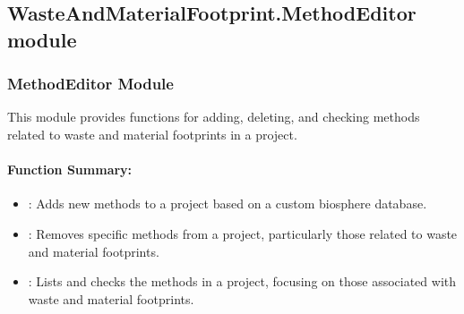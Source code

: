 \documentclass[letterpaper,10pt,english]{sphinxmanual}
\begin{document}
\subsection{WasteAndMaterialFootprint.MethodEditor module}
\label{\detokenize{WasteAndMaterialFootprint:module-WasteAndMaterialFootprint.MethodEditor}}\label{\detokenize{WasteAndMaterialFootprint:wasteandmaterialfootprint-methodeditor-module}}

\subsubsection{MethodEditor Module}
\label{\detokenize{WasteAndMaterialFootprint:methodeditor-module}}
\sphinxAtStartPar
This module provides functions for adding, deleting, and checking methods related to waste and material footprints in a project.


\paragraph{Function Summary:}
\label{\detokenize{WasteAndMaterialFootprint:function-summary}}\begin{itemize}
\item {} 
\sphinxAtStartPar
{}: Adds new methods to a project based on a custom biosphere database.

\item {} 
\sphinxAtStartPar
{}: Removes specific methods from a project, particularly those related to waste and material footprints.

\item {} 
\sphinxAtStartPar
{}: Lists and checks the methods in a project, focusing on those associated with waste and material footprints.

\end{itemize}
\end{document}
